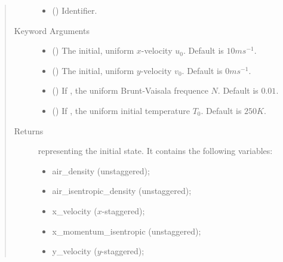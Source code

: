 \documentclass[letterpaper,10pt,english]{sphinxmanual}
\begin{document}
\begin{fulllineitems}
\begin{fulllineitems}
\begin{quote}
\begin{description}
\begin{itemize}
\item {} 
 () \textendash{} Identifier.

\end{itemize}

\item[{Keyword Arguments}] \leavevmode\begin{itemize}
\item {} 
 () \textendash{} The initial, uniform \(x\)-velocity \(u_0\). Default is \(10 m s^{-1}\).

\item {} 
 () \textendash{} The initial, uniform \(y\)-velocity \(v_0\). Default is \(0 m s^{-1}\).

\item {} 
 () \textendash{} If , the uniform Brunt-Vaisala frequence \(N\). Default is \(0.01\).

\item {} 
 () \textendash{} If , the uniform initial temperature \(T_0\). Default is \(250 K\).

\end{itemize}

\item[{Returns}] \leavevmode

{\hyperref[\detokenize{api:storages.state_isentropic.StateIsentropic}]{}} representing the initial state.
It contains the following variables:
\begin{itemize}
\item {} 
air\_density (unstaggered);

\item {} 
air\_isentropic\_density (unstaggered);

\item {} 
x\_velocity (\(x\)-staggered);

\item {} 
x\_momentum\_isentropic (unstaggered);

\item {} 
y\_velocity (\(y\)-staggered);


\end{itemize}
\end{description}
\end{quote}
\end{fulllineitems}
\end{fulllineitems}
\end{document}
